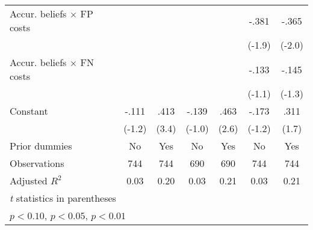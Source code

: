 \begin{table}[htbp]
\begin{tabular}{l*{6}{c}}
Accur. beliefs $\times$ FP costs&                  &                  &                  &                  &    -.381\sym{*}  &    -.365\sym{*}  \\
                &                  &                  &                  &                  &   (-1.9)         &   (-2.0)         \\
Accur. beliefs $\times$ FN costs&                  &                  &                  &                  &    -.133         &    -.145         \\
                &                  &                  &                  &                  &   (-1.1)         &   (-1.3)         \\
Constant        &    -.111         &     .413\sym{***}&    -.139         &     .463\sym{***}&    -.173         &     .311\sym{*}  \\
                &   (-1.2)         &    (3.4)         &   (-1.0)         &    (2.6)         &   (-1.2)         &    (1.7)         \\
Prior dummies   &       No         &      Yes         &       No         &      Yes         &       No         &      Yes         \\
\hline
Observations    &      744         &      744         &      690         &      690         &      744         &      744         \\
Adjusted \(R^{2}\)&     0.03         &     0.20         &     0.03         &     0.21         &     0.03         &     0.21         \\
\hline\hline
\multicolumn{7}{l}{\footnotesize \textit{t} statistics in parentheses}\\
\multicolumn{7}{l}{\footnotesize \sym{*} \(p<0.10\), \sym{**} \(p<0.05\), \sym{***} \(p<0.01\)}\\
\end{tabular}
\end{table}
